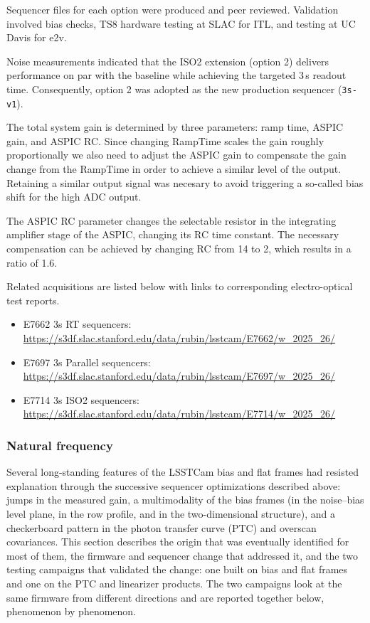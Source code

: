 Sequencer files for each option were produced and peer reviewed. Validation involved bias checks, TS8 hardware testing at SLAC for ITL, and testing at UC Davis for e2v. 

Noise measurements indicated that the ISO2 extension (option 2) delivers performance on par with the baseline while achieving the targeted 3\,s readout time. Consequently, option 2 was adopted as the new production sequencer (\texttt{3s-v1}).

The total system gain is determined by three parameters: ramp time, ASPIC gain, and ASPIC RC. Since changing RampTime scales the gain roughly proportionally we also need to adjust the ASPIC gain to compensate the gain change from the RampTime in order to achieve a similar level of the output. Retaining a similar output signal was necesary to avoid triggering a so-called bias shift for the high ADC output.

The ASPIC RC parameter changes the selectable resistor in the integrating amplifier stage of the ASPIC, changing its RC time constant. The necessary compensation can be achieved by changing RC from 14 to 2, which results in a ratio of 1.6.

Related acquisitions are listed below with links to corresponding electro-optical test reports.

\begin{itemize}
    \item E7662 3s RT sequencers: \url{https://s3df.slac.stanford.edu/data/rubin/lsstcam/E7662/w_2025_26/}
    \item E7697 3s Parallel sequencers: \url{https://s3df.slac.stanford.edu/data/rubin/lsstcam/E7697/w_2025_26/}
    \item E7714 3s ISO2 sequencers: \url{https://s3df.slac.stanford.edu/data/rubin/lsstcam/E7714/w_2025_26/}
\end{itemize}






\subsubsection{Natural frequency}
\label{subsubsec:natural-frequency}

Several long-standing features of the LSSTCam bias and flat frames had resisted explanation
through the successive sequencer optimizations described above: jumps in the measured gain,
a multimodality of the bias frames (in the noise--bias level plane, in the row profile, and in
the two-dimensional structure), and a checkerboard pattern in the photon transfer curve (PTC) and
overscan covariances. This section describes the origin that was eventually identified for most of
them, the firmware and sequencer change that addressed it, and the two testing campaigns that
validated the change: one built on bias and flat frames and one on the PTC and linearizer
products. The two campaigns look at the same firmware from different directions and are reported
together below, phenomenon by phenomenon.

